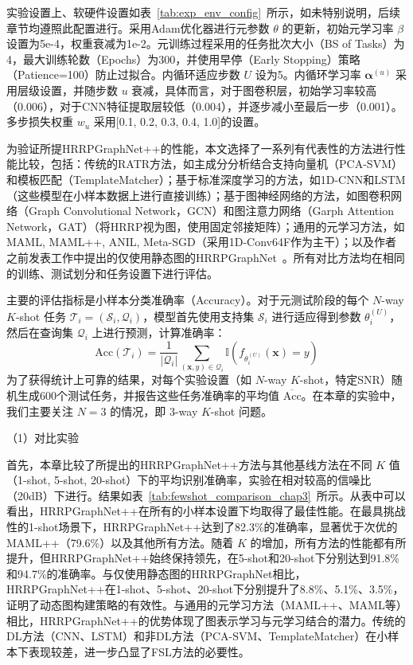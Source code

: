 实验设置上、软硬件设置如表~\ref{tab:exp_env_config}~所示，如未特别说明，后续章节均遵照此配置进行。采用Adam优化器进行元参数 $\theta$ 的更新，初始元学习率 $\beta$ 设置为5e-4，权重衰减为1e-2。元训练过程采用的任务批次大小（BS of Tasks）为4，最大训练轮数（Epochs）为300，并使用早停（Early Stopping）策略（Patience=100）防止过拟合。内循环适应步数 $U$ 设为5。内循环学习率 $\boldsymbol{\alpha}^{(u)}$ 采用层级设置，并随步数 $u$ 衰减，具体而言，对于图卷积层，初始学习率较高（0.006），对于CNN特征提取层较低（0.004），并逐步减小至最后一步（0.001）。多步损失权重 $w_u$ 采用[0.1, 0.2, 0.3, 0.4, 1.0]的设置。

为验证所提HRRPGraphNet++的性能，本文选择了一系列有代表性的方法进行性能比较，包括：传统的RATR方法，如主成分分析结合支持向量机（PCA-SVM）和模板匹配（TemplateMatcher）；基于标准深度学习的方法，如1D-CNN和LSTM（这些模型在小样本数据上进行直接训练）；基于图神经网络的方法，如图卷积网络（Graph Convolutional Network，GCN）和图注意力网络（Garph Attention Network，GAT）（将HRRP视为图，使用固定邻接矩阵）；通用的元学习方法，如MAML, MAML++, ANIL, Meta-SGD（采用1D-Conv64F作为主干）；以及作者之前发表工作中提出的仅使用静态图的HRRPGraphNet~。所有对比方法均在相同的训练、测试划分和任务设置下进行评估。

主要的评估指标是小样本分类准确率（Accuracy）。对于元测试阶段的每个 $N$-way $K$-shot 任务 $\mathcal{T}_i = (\mathcal{S}_i, \mathcal{Q}_i)$，模型首先使用支持集 $\mathcal{S}_i$ 进行适应得到参数 $\theta_i^{(U)}$，然后在查询集 $\mathcal{Q}_i$ 上进行预测，计算准确率：
\begin{equation}
    \text{Acc}(\mathcal{T}_i) = \frac{1}{|\mathcal{Q}_i|} \sum_{(\mathbf{x},y) \in \mathcal{Q}_i} \mathbb{I}(f_{\theta_i^{(U)}}(\mathbf{x}) = y)
    \label{eq:accuracy_metric}
\end{equation}
为了获得统计上可靠的结果，对每个实验设置（如 $N$-way $K$-shot，特定SNR）随机生成600个测试任务，并报告这些任务准确率的平均值 $\overline{\text{Acc}}$。在本章的实验中，我们主要关注 $N=3$ 的情况，即 3-way $K$-shot 问题。

（1）对比实验

首先，本章比较了所提出的HRRPGraphNet++方法与其他基线方法在不同 $K$ 值（1-shot, 5-shot, 20-shot）下的平均识别准确率，实验在相对较高的信噪比（20dB）下进行。结果如表~\ref{tab:fewshot_comparison_chap3}~所示。从表中可以看出，HRRPGraphNet++在所有的小样本设置下均取得了最佳性能。在最具挑战性的1-shot场景下，HRRPGraphNet++达到了82.3\%的准确率，显著优于次优的MAML++（79.6\%）以及其他所有方法。随着 $K$ 的增加，所有方法的性能都有所提升，但HRRPGraphNet++始终保持领先，在5-shot和20-shot下分别达到91.8\%和94.7\%的准确率。与仅使用静态图的HRRPGraphNet相比，HRRPGraphNet++在1-shot、5-shot、20-shot下分别提升了8.8\%、5.1\%、3.5\%，证明了动态图构建策略的有效性。与通用的元学习方法（MAML++、MAML等）相比，HRRPGraphNet++的优势体现了图表示学习与元学习结合的潜力。传统的DL方法（CNN、LSTM）和非DL方法（PCA-SVM、TemplateMatcher）在小样本下表现较差，进一步凸显了FSL方法的必要性。

